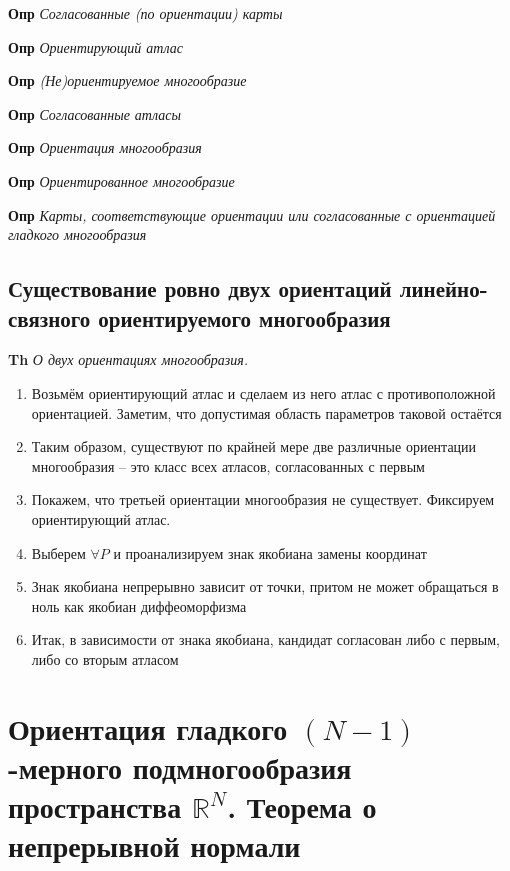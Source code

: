 \documentclass[a4paper, 14pt]{article}
\begin{document}
    \textbf{Опр} \textit{Согласованные (по ориентации) карты}
    
    \textbf{Опр} \textit{Ориентирующий атлас}
    
    \textbf{Опр} \textit{(Не)ориентируемое многообразие}
    
    \textbf{Опр} \textit{Согласованные атласы}
    
    \textbf{Опр} \textit{Ориентация многообразия}
    
    \textbf{Опр} \textit{Ориентированное многообразие}
    
    \textbf{Опр} \textit{Карты, соответствующие ориентации или согласованные с ориентацией гладкого многообразия}
    
    \subsection{Существование ровно двух ориентаций линейно-связного ориентируемого многообразия}
    
    \textbf{Th} \textit{О двух ориентациях многообразия.}
    
    \begin{enumerate}
        \item Возьмём ориентирующий атлас и сделаем из него атлас с противоположной ориентацией.
        Заметим, что допустимая область параметров таковой остаётся
        \item Таким образом, существуют по крайней мере две различные ориентации многообразия -- это класс всех
        атласов, согласованных с первым
        \item Покажем, что третьей ориентации многообразия не существует.
        Фиксируем ориентирующий атлас.
        \item Выберем $\forall P$ и проанализируем знак якобиана замены координат
        \item Знак якобиана непрерывно зависит от точки, притом не может обращаться в ноль как якобиан диффеоморфизма
        \item Итак, в зависимости от знака якобиана, кандидат согласован либо с первым, либо со вторым атласом
    \end{enumerate}
    
    \section{Ориентация гладкого $(N - 1)$-мерного подмногообразия пространства $\mathbb{R}^N$.
    Теорема о непрерывной нормали}
    
\end{document}
